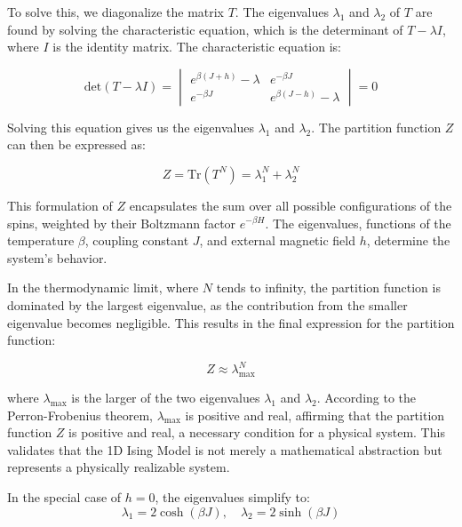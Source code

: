 To solve this, we diagonalize the matrix \( T \). The eigenvalues \( \lambda_1
\) and \( \lambda_2 \) of \( T \) are found by solving the characteristic
equation, which is the determinant of \( T - \lambda I \), where \( I \) is the
identity matrix. The characteristic equation is:

\begin{equation}
\text{det}(T - \lambda I) = \begin{vmatrix}
    e^{\beta(J+h)} - \lambda & e^{-\beta J} \\
    e^{-\beta J} & e^{\beta(J-h)} - \lambda
\end{vmatrix} = 0
\end{equation}

Solving this equation gives us the eigenvalues \( \lambda_1 \) and \( \lambda_2
\). The partition function \( Z \) can then be expressed as:

\begin{equation}
Z = \text{Tr}(T^N) = \lambda_1^N + \lambda_2^N
\end{equation}

This formulation of \( Z \) encapsulates the sum over all possible
configurations of the spins, weighted by their Boltzmann factor \( e^{-\beta H}
\). The eigenvalues, functions of the temperature \( \beta \), coupling constant
\( J \), and external magnetic field \( h \), determine the system's behavior.

In the thermodynamic limit, where \( N \) tends to infinity, the partition
function is dominated by the largest eigenvalue, as the contribution from the
smaller eigenvalue becomes negligible. This results in the final expression for
the partition function:

\begin{equation}
Z \approx \lambda_{\text{max}}^N
\label{eq:partitionmax}
\end{equation}

where \( \lambda_{\text{max}} \) is the larger of the two eigenvalues \(
\lambda_1 \) and \( \lambda_2 \). According to the Perron-Frobenius theorem, \(
\lambda_{\text{max}} \) is positive and real, affirming that the partition
function \( Z \) is positive and real, a necessary condition for a physical
system. This validates that the 1D Ising Model is not merely a mathematical
abstraction but represents a physically realizable system.

In the special case of \( h = 0 \), the eigenvalues simplify to:
\begin{equation}
 \lambda_1 = 2 \cosh(\beta J), \quad \lambda_2 = 2 \sinh(\beta J)
\end{equation}

